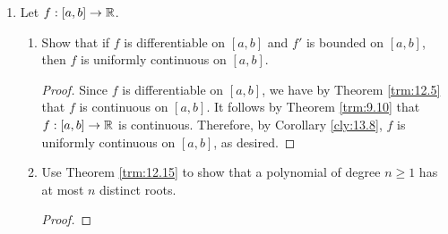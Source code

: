\documentclass[../main.tex]{subfiles}
\begin{document}
\begin{enumerate}
\begin{proof}
        If $n=m$, then we have that $|b_n-b_m|=0<\epsilon$, as desired.\par
        If $n<m$, then the argument is symmetric to that of the first case.\par\smallskip
        Now suppose that $\lim_{n\to\infty}b_n$ exists. To prove that $\sum_{n=1}^\infty a_n$ converges, Theorem \ref{trm:16.5} tells us that it will suffice to show that for all $\epsilon>0$, there is some $N\in\N$ such that $|\sum_{k=m+1}^na_k|<\epsilon$ for all $n>m\geq N$. Let $\epsilon>0$ be arbitrary. Then by Theorem \ref{trm:15.19}, there is some $N\in\N$ such that $|b_n-b_m|<\epsilon$ for all $n,m\geq N$. Choose this $N$ to be our $N$. Let $n,m$ be arbitrary natural numbers that satisfy $n>m\geq N$. In addition to the two aforementioned preliminary results, we need one more, i.e., we now seek to confirm that $a_{i+1}\leq\int_i^{i+1}f$. To begin, $a_i=f(i)$. Additionally, we have by Definition \ref{dfn:8.16} that $f(x)\geq f(i)$ for all $x<i$. Thus, by Theorem \ref{trm:13.27}, $a_{i+1}=a_{i+1}((i+1)-i)\leq\int_i^{i+1}f$, as desired. With these results, we have that
        \begin{align*}
            \left| \sum_{k=m+1}^na_k \right| &= \sum_{k=m+1}^na_k\tag*{Definition \ref{dfn:8.4}}\\
            &= a_{m+1}+a_{m+2}+\cdots+a_n\\
            &\leq \int_m^{m+1}f+\int_{m+1}^{m+2}f+\cdots+\int_{n-1}^nf\\
            &= \int_m^nf\tag*{Theorem \ref{trm:13.23}}\\
            &= \left| \int_m^nf \right|\tag*{Definition \ref{dfn:8.4}}\\
            &= \left| \int_1^nf-\int_1^mf \right|\tag*{Theorem \ref{trm:13.23}}\\
            &= |b_n-b_m|\\
            &< \epsilon
        \end{align*}
        as desired.
    \end{proof}
    \item Let $f:[a,b]\to\mathbb{R}$.
    \begin{enumerate}
        \item Show that if $f$ is differentiable on $[a,b]$ and $f'$ is bounded on $[a,b]$, then $f$ is uniformly continuous on $[a,b]$.
        \begin{proof}
            Since $f$ is differentiable on $[a,b]$, we have by Theorem \ref{trm:12.5} that $f$ is continuous on $[a,b]$. It follows by Theorem \ref{trm:9.10} that $f:[a,b]\to\mathbb{R}$ is continuous. Therefore, by Corollary \ref{cly:13.8}, $f$ is uniformly continuous on $[a,b]$, as desired.
        \end{proof}
        \item Use Theorem \ref{trm:12.15} to show that a polynomial of degree $n\geq 1$ has at most $n$ distinct roots.
        \begin{proof}


\end{proof}
\end{enumerate}
\end{enumerate}
\end{document}
